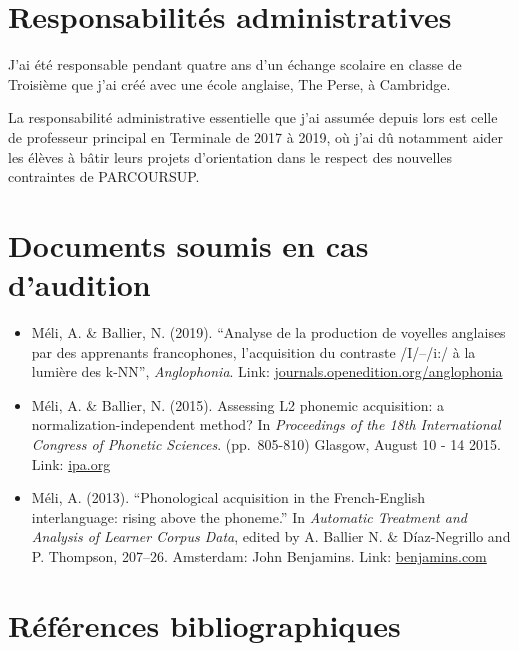 \documentclass[
  10pt,
]{article}
\begin{document}
\hypertarget{responsabilituxe9s-administratives}{%
\section{Responsabilités administratives}\label{responsabilituxe9s-administratives}}

J'ai été responsable pendant quatre ans d'un échange scolaire en classe de Troisième que j'ai créé avec une école anglaise, The Perse, à Cambridge.

La responsabilité administrative essentielle que j'ai assumée depuis lors est celle de
professeur principal en Terminale de 2017 à 2019, où j'ai dû
notamment aider les élèves à bâtir leurs projets d'orientation dans le
respect des nouvelles contraintes de PARCOURSUP.

\hypertarget{anglophonia}{%
\section{Documents soumis en cas d'audition}\label{anglophonia}}

\begin{itemize}
\item
  Méli, A. \& Ballier, N. (2019). ``Analyse de la production de voyelles anglaises par des apprenants francophones, l'acquisition du contraste /I/--/i:/ à la lumière des k-NN'', \emph{Anglophonia}. Link: \href{https://journals.openedition.org/anglophonia/2109}{journals.openedition.org/anglophonia}
\item
  Méli, A. \& Ballier, N. (2015). Assessing L2 phonemic acquisition: a normalization-independent method? In \emph{Proceedings of the 18th International Congress of Phonetic Sciences}. (pp.~805-810) Glasgow, August 10 - 14 2015. Link: \href{https://www.internationalphoneticassociation.org/icphs-proceedings/ICPhS2015/Papers/ICPHS0805.pdf}{ipa.org}
\item
  Méli, A. (2013). ``Phonological acquisition in the French-English interlanguage: rising above the phoneme.'' In \emph{Automatic Treatment and Analysis of Learner Corpus Data}, edited by A. Ballier N. \& Díaz-Negrillo and P. Thompson, 207--26. Amsterdam: John Benjamins. Link: \href{https://benjamins.com/catalog/scl.59.13mel}{benjamins.com}
\end{itemize}

\hypertarget{ruxe9fuxe9rences-bibliographiques}{%
\section*{Références bibliographiques}\label{ruxe9fuxe9rences-bibliographiques}}
\end{document}
